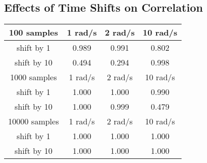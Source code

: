 \subsection{Effects of Time Shifts on Correlation}
\begin{table}[h]
\centering
\begin{tabular}{|c|c|c|c|}
\hline
100 samples & 1 rad/s & 2 rad/s & 10 rad/s \\ \hline
shift by 1  & 0.989   & 0.991   & 0.802    \\ \hline        
shift by 10 & 0.494	  & 0.294   & 0.998    \\ \hline
\hline
1000 samples & 1 rad/s & 2 rad/s & 10 rad/s \\ \hline
shift by 1  & 1.000   & 1.000   & 0.990   \\ \hline        
shift by 10 & 1.000	  & 0.999   & 0.479    \\ \hline
\hline
10000 samples & 1 rad/s & 2 rad/s & 10 rad/s \\ \hline
shift by 1  & 1.000   & 1.000   & 1.000    \\ \hline        
shift by 10 & 1.000	  & 1.000   & 1.000    \\ \hline

\end{tabular}
\
\end{table}
